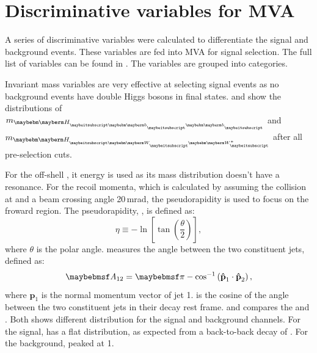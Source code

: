\section{Discriminative variables for MVA}

A series of discriminative variables were calculated to differentiate the signal and background events. These variables are fed into MVA for signal selection. The full list of variables can be found in . The variables are grouped into categories.

Invariant mass variables are very effective at selecting signal events as no background events have double Higgs bosons in final states.  and  show the distributions of $m_{\Hbb}$ and $m_{\HWW}$ after all pre-selection cuts.

For the off-shell \W*, it energy is used as its mass distribution doesn't have a resonance. For the recoil momenta, which is calculated by assuming the collision at \sqrtS and a beam crossing angle 20\,mrad, the pseudorapidity is used to focus on the froward region. The pseudorapidity, \eta, is defined as:
\begin{equation}
\eta \equiv  - \ln \left[ \tan \left( \frac{\theta}{2} \right) \right],
\end{equation}
where $\theta$ is the polar angle.  measures the angle between the two constituent jets, defined as:
\begin{equation}
\acolinearity{12} = \pi - \cos^{-1}\left(\textbf{\^{p}}_1\cdot\textbf{\^{p}}_2\right),
\end{equation}
where $\textbf{\^{p}}_1$ is the normal momentum vector of jet 1.  is the cosine of the angle between the two constituent jets in their decay rest frame.  and  compares the \acolinearity{\Hbb} and  \cosStar{\Hbb}. Both shows different distribution for the signal and background channels.  For the signal, \cosStar{\Hbb} has a flat distribution, as expected from a back-to-back decay of \HepProcess{\PHiggs \to \Pbottom \APbottom}. For the background, \cosStar{\Hbb}  peaked at 1.

